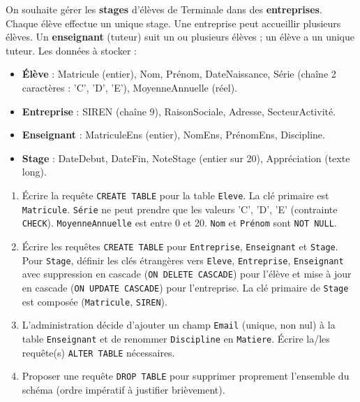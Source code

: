 \documentclass[11pt]{article}
\begin{document}
\begin{exercice}
On souhaite gérer les \textbf{stages} d'élèves de Terminale dans des \textbf{entreprises}. Chaque élève effectue un unique stage. Une entreprise peut accueillir plusieurs élèves. Un \textbf{enseignant} (tuteur) suit un ou plusieurs élèves ; un élève a un unique tuteur. Les données à stocker :
\begin{itemize}
    \item \textbf{Élève} : Matricule (entier), Nom, Prénom, DateNaissance, Série (chaîne 2 caractères : 'C', 'D', 'E'), MoyenneAnnuelle (réel).
    \item \textbf{Entreprise} : SIREN (chaîne 9), RaisonSociale, Adresse, SecteurActivité.
    \item \textbf{Enseignant} : MatriculeEns (entier), NomEns, PrénomEns, Discipline.
    \item \textbf{Stage} : DateDebut, DateFin, NoteStage (entier sur 20), Appréciation (texte long).
\end{itemize}
\begin{enumerate}
    \item Écrire la requête \texttt{CREATE TABLE} pour la table \texttt{Eleve}. La clé primaire est \texttt{Matricule}. \texttt{Série} ne peut prendre que les valeurs 'C', 'D', 'E' (contrainte \texttt{CHECK}). \texttt{MoyenneAnnuelle} est entre 0 et 20. \texttt{Nom} et \texttt{Prénom} sont \texttt{NOT NULL}.
    \item Écrire les requêtes \texttt{CREATE TABLE} pour \texttt{Entreprise}, \texttt{Enseignant} et \texttt{Stage}. Pour \texttt{Stage}, définir les clés étrangères vers \texttt{Eleve}, \texttt{Entreprise}, \texttt{Enseignant} avec suppression en cascade (\texttt{ON DELETE CASCADE}) pour l'élève et mise à jour en cascade (\texttt{ON UPDATE CASCADE}) pour l'entreprise. La clé primaire de \texttt{Stage} est composée (\texttt{Matricule}, \texttt{SIREN}).
    \item L'administration décide d'ajouter un champ \texttt{Email} (unique, non nul) à la table \texttt{Enseignant} et de renommer \texttt{Discipline} en \texttt{Matiere}. Écrire la/les requête(s) \texttt{ALTER TABLE} nécessaires.
    \item Proposer une requête \texttt{DROP TABLE} pour supprimer proprement l'ensemble du schéma (ordre impératif à justifier brièvement).
\end{enumerate}
\end{exercice}
\end{document}
